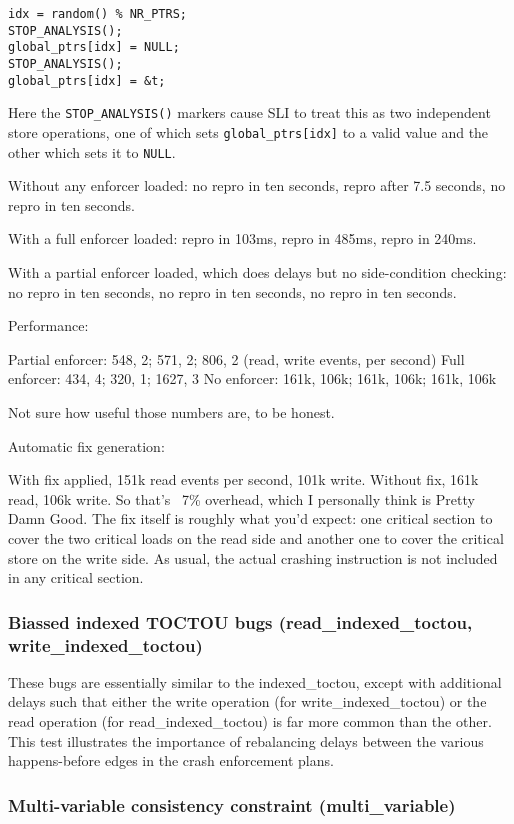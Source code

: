 \begin{verbatim}
idx = random() % NR_PTRS;
STOP_ANALYSIS();
global_ptrs[idx] = NULL;
STOP_ANALYSIS();
global_ptrs[idx] = &t;
\end{verbatim}

Here the \verb|STOP_ANALYSIS()| markers cause SLI to treat this as two
independent store operations, one of which sets
\verb|global_ptrs[idx]| to a valid value and the other which sets it
to \verb|NULL|.

Without any enforcer loaded: no repro in ten seconds, repro after 7.5
seconds, no repro in ten seconds.

With a full enforcer loaded: repro in 103ms, repro in 485ms, repro in
240ms.

With a partial enforcer loaded, which does delays but no
side-condition checking: no repro in ten seconds, no repro in ten
seconds, no repro in ten seconds.

Performance:

Partial enforcer: 548, 2; 571, 2; 806, 2 (read, write events, per second)
Full enforcer: 434, 4; 320, 1; 1627, 3
No enforcer: 161k, 106k; 161k, 106k; 161k, 106k

Not sure how useful those numbers are, to be honest.

Automatic fix generation:

With fix applied, 151k read events per second, 101k write.  Without
fix, 161k read, 106k write.  So that's ~7\% overhead, which I
personally think is Pretty Damn Good.  The fix itself is roughly what
you'd expect: one critical section to cover the two critical loads on
the read side and another one to cover the critical store on the write
side.  As usual, the actual crashing instruction is not included in
any critical section.

\subsubsection{Biassed indexed TOCTOU bugs (read\_indexed\_toctou, write\_indexed\_toctou)}

These bugs are essentially similar to the indexed\_toctou, except with
additional delays such that either the write operation (for
write\_indexed\_toctou) or the read operation (for
read\_indexed\_toctou) is far more common than the other.  This test
illustrates the importance of rebalancing delays between the various
happens-before edges in the crash enforcement plans.

\subsubsection{Multi-variable consistency constraint (multi\_variable)}


